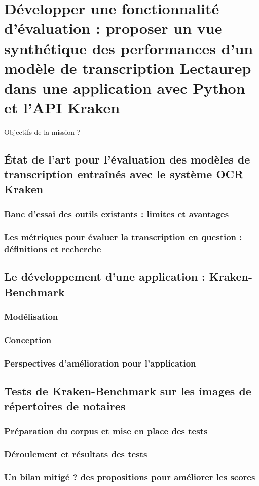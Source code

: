 \part{Développer une fonctionnalité d'évaluation : proposer un vue synthétique des performances d'un modèle de transcription Lectaurep dans une application avec Python et l'API Kraken}

Objectifs de la mission ? 

\chapter{État de l'art pour l'évaluation des modèles de transcription entraînés avec le système OCR Kraken}
\section{Banc d'essai des outils existants : limites et avantages}
\section{Les métriques pour évaluer la transcription en question : définitions et recherche}

\chapter{Le développement d'une application : Kraken-Benchmark}
\section{Modélisation}
\section{Conception}
\section{Perspectives d'amélioration pour l'application}

\chapter{Tests de Kraken-Benchmark sur les images de répertoires de notaires}
\section{Préparation du corpus et mise en place des tests}
\section{Déroulement et résultats des tests}
\section{Un bilan mitigé ? des propositions pour améliorer les scores}